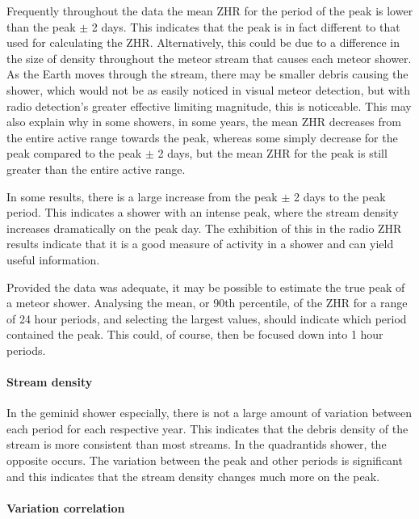 Frequently throughout the data the mean ZHR for the period of the peak is lower
than the peak $\pm$ 2 days. This indicates that the peak is in fact different
to that used for calculating the ZHR. Alternatively, this could be due to a
difference in the size of density throughout the meteor stream that causes each
meteor shower. As the Earth moves through the stream, there may be smaller
debris causing the shower, which would not be as easily noticed in visual
meteor detection, but with radio detection's greater effective limiting
magnitude, this is noticeable. This may also explain why in some showers, in
some years, the  mean ZHR decreases from the entire active range towards the
peak, whereas some simply decrease for the peak compared to the peak $\pm$ 2
days, but the mean ZHR for the peak is still greater than the entire active
range. 

In some results, there is a large increase from the peak $\pm$ 2 days to the
peak period. This indicates a shower with an intense peak, where the stream
density increases dramatically on the peak day. The exhibition of this in the
radio ZHR results indicate that it is a good measure of activity in a shower and
can yield useful information.

Provided the data was adequate, it may be possible to estimate the true
peak of a meteor shower. Analysing the mean, or 90th percentile, of the ZHR for
a range of 24 hour periods, and selecting the largest values, should indicate
which period contained the peak. This could, of course, then be focused down
into 1 hour periods.

\paragraph{Stream density\\}

In the geminid shower especially, there is not a large amount of variation
between each period for each respective year. This indicates that the debris
density of the stream is more consistent than most streams. In the quadrantids
shower, the opposite occurs. The variation between the peak and other periods
is significant and this indicates that the stream density changes much more on
the peak.

\paragraph{Variation correlation\\}

